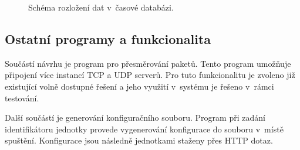 \begin{figure}[h]
  \centering
  \caption{Schéma rozložení dat v~časové databázi.}\label{pic:time_series_design}
\end{figure}

\subsection{Ostatní programy a funkcionalita}
Součástí návrhu je program pro přesměrování paketů. Tento program umožňuje připojení více instancí TCP a UDP serverů. Pro tuto funkcionalitu je zvoleno již existující volně dostupné řešení a jeho využití v~systému je řešeno v~rámci testování. 

Další součástí je generování konfiguračního souboru. Program při zadání identifikátoru jednotky provede vygenerování konfigurace do souboru v~místě spuštění. Konfigurace jsou následně jednotkami staženy přes HTTP dotaz.
